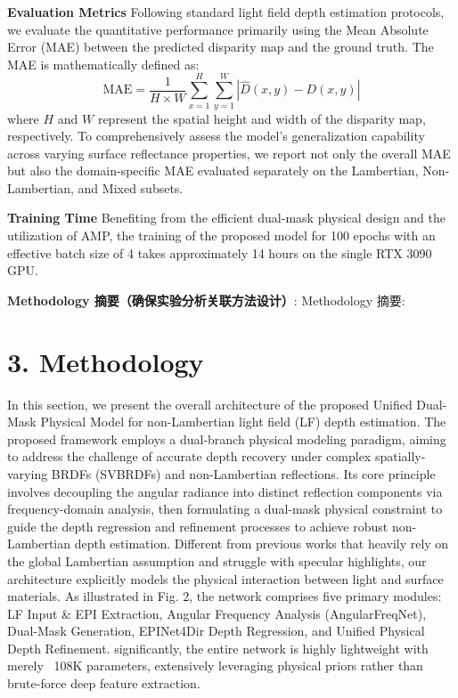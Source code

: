 \textbf{Evaluation Metrics}  
Following standard light field depth estimation protocols, we evaluate the quantitative performance primarily using the Mean Absolute Error (MAE) between the predicted disparity map and the ground truth. The MAE is mathematically defined as:
\begin{equation}
\label{eq:eq52}
\text{MAE} = \frac{1}{H \times W} \sum_{x=1}^{H} \sum_{y=1}^{W} \left| \hat{D}(x,y) - D(x,y) \right|
\end{equation}
where $H$ and $W$ represent the spatial height and width of the disparity map, respectively. To comprehensively assess the model's generalization capability across varying surface reflectance properties, we report not only the overall MAE but also the domain-specific MAE evaluated separately on the Lambertian, Non-Lambertian, and Mixed subsets. 

\textbf{Training Time}  
Benefiting from the efficient dual-mask physical design and the utilization of AMP, the training of the proposed model for 100 epochs with an effective batch size of 4 takes approximately 14 hours on the single RTX 3090 GPU.

\textbf{Methodology 摘要（确保实验分析关联方法设计）}:
Methodology 摘要:
\section{3. Methodology}

In this section, we present the overall architecture of the proposed Unified Dual-Mask Physical Model for non-Lambertian light field (LF) depth estimation. The proposed framework employs a dual-branch physical modeling paradigm, aiming to address the challenge of accurate depth recovery under complex spatially-varying BRDFs (SVBRDFs) and non-Lambertian reflections. Its core principle involves decoupling the angular radiance into distinct reflection components via frequency-domain analysis, then formulating a dual-mask physical constraint to guide the depth regression and refinement processes to achieve robust non-Lambertian depth estimation. Different from previous works that heavily rely on the global Lambertian assumption and struggle with specular highlights, our architecture explicitly models the physical interaction between light and surface materials. As illustrated in Fig. 2, the network comprises five primary modules: LF Input \& EPI Extraction, Angular Frequency Analysis (AngularFreqNet), Dual-Mask Generation, EPINet4Dir Depth Regression, and Unified Physical Depth Refinement. significantly, the entire network is highly lightweight with merely ~108K parameters, extensively leveraging physical priors rather than brute-force deep feature extraction.

